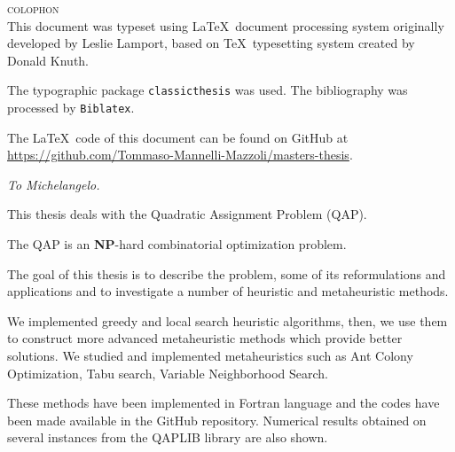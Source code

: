 \documentclass[oneside,%
			   openright,%
			   a4paper]{book}
\newenvironment{abstract}%
{\cleardoublepage%
	\thispagestyle{empty}%
	\null \vfill\begin{center}%
		\bfseries \abstractname \end{center}}%
{\vfill\null}
\theoremstyle{definition}
\theoremstyle{remark}
\theoremstyle{plain}
\begin{document}
\frontmatter 
\begin{frontespizio}
\end{frontespizio}


\newpage
\vspace*{\fill}

\begin{flushleft}	
\noindent \textsc{colophon} \mbox{}\\
\noindent This document was typeset using \LaTeX \, document processing system originally developed by Leslie Lamport, based on \TeX \, typesetting system created by Donald Knuth. 

The typographic package \texttt{classicthesis} was used. The bibliography was processed by \texttt{Biblatex}. 

The \LaTeX \ code of this document can be found on GitHub at \url{https://github.com/Tommaso-Mannelli-Mazzoli/masters-thesis}.
\end{flushleft}



\newpage
\null{}
\begin{flushright}%
\textit{To Michelangelo.}
\end{flushright}
\null



\begin{abstract}
This thesis deals with the Quadratic Assignment Problem (QAP).

The QAP is an \textbf{NP}-hard combinatorial optimization problem.
	
The goal of this thesis is to describe the problem, some of its reformulations and applications and to investigate a number of heuristic and metaheuristic methods.	

We implemented greedy and local search heuristic algorithms, then,
we use them to construct more advanced metaheuristic methods  which provide
better solutions. We studied and implemented metaheuristics such as Ant Colony
Optimization, Tabu search, Variable Neighborhood Search.

These methods have been implemented in Fortran language and the codes have been made available in the GitHub repository. Numerical results obtained on several instances from the QAPLIB library are also shown.
\end{abstract}
\end{document}
